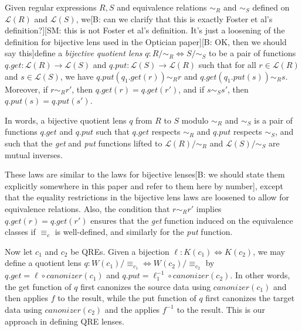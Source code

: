 \documentclass[acmsmall,review,anonymous]{acmart}
\newcommand{\FINISH}[3]{\ifdraft\textcolor{#1}{[#2: #3]}\fi}
\newcommand{\bcp}[1]{\FINISH{dkred}{B}{#1}}
\newcommand{\sam}[1]{\FINISH{dkpurple}{SM}{#1}}
\newcommand{\kw}[1]{\ensuremath{\mathit{#1}}}
\newcommand{\canonizer}{\ensuremath{\kw{canonizer}}}
\newcommand{\get}{\ensuremath{\kw{get}}}
\newcommand{\lput}{\ensuremath{\kw{put}}}
\newcommand{\eqrel}[1]{\ensuremath{\equiv_{#1}}}
\begin{document}
Given regular expressions $R, S$ and equivalence relations
$\sim_R$ and $\sim_S$ defined on $\mathcal{L}(R)$ and $\mathcal{L}(S)$,
we\bcp{can we clarify that this is exactly Foster et al's 
definition?}\sam{this is not Foster et al's definition. It's just a
loosening of the definition for bijective lens used in the Optician
paper}\bcp{OK, then we should say this}define
a {\em bijective quotient lens} $q :
R /{\sim_R} \Leftrightarrow S/{\sim_S}$ to be a pair of functions $q.\get :
\mathcal{L}(R) \longrightarrow \mathcal{L}(S)$ and $q.\lput : \mathcal{L}(S)
\longrightarrow \mathcal{L}(R)$ such that for all $r \in \mathcal{L}(R)$ and $s
\in \mathcal{L}(S)$, we have $q.\lput(q_1.\get(r)) \sim_R r$ and
$q.\get(q_1.\lput(s)) \sim_R s$. Moreover, if $r \sim_R r'$, then $q.\get(r) =
q.\get(r')$, and if $s \sim_S s'$, then $q.\lput(s) = q.\lput(s')$.

In words, a bijective quotient lens $q$ from $R$ to $S$ modulo $\sim_R$
and $\sim_S$ is a pair of functions $q.\get$ and $q.\lput$ such that
$q.\get$ respects $\sim_R$ and $q.\lput$ respects $\sim_S$, and such that
the {\em get} and {\em put} functions lifted to $\mathcal{L}(R)/{\sim_R}$ and
$\mathcal{L}(S)/{\sim_S}$ are mutual inverses.

These laws are similar to the laws for bijective lenses\bcp{we should state
  them explicitly somewhere in this paper and refer to them here by number},
except that the 
equality restrictions in the bijective lens laws are loosened to allow for
equivalence relations. Also, the condition that $r \sim_R r'$ implies
$q.\get(r) = q.\get(r')$ ensures that the {\em get} function induced on
the equivalence classes if $\equiv_c$ is well-defined, and similarly for
the {\em put} function. 

Now let $c_1$ and $c_2$ be QREs. Given a bijection $\ell : K(c_1)
\Leftrightarrow K(c_2)$, we may define a quotient lens $q : W(c_1)/\eqrel{c_1}
\Leftrightarrow W(c_2)/\eqrel{c_2}$ by $q.\get = \ell \circ \canonizer(c_1)
$ and $q.\lput = \ell_1^{-1} \circ \canonizer(c_2)$. In other words, the get
function of $q$ first canonizes the source data using $\canonizer(c_1)$
and then applies $f$ to the result, while the put function of $q$ first
canonizes the target data using $\canonizer(c_2)$ and the applies $f^{-1}$ to
the result. This is our approach in defining QRE lenses.
\end{document}
